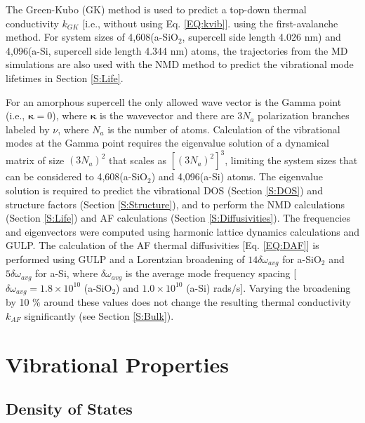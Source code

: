 \documentclass[aps,prb,onecolumn,preprint,superscriptaddress,footinbib,amsmath,amssymb,floatfix]{revtex4}
\begin{document}
The Green-Kubo (GK) method is used to predict a top-down thermal 
conductivity $k_{GK}$ [i.e., without using Eq. \eqref{EQ:kvib}].
\cite{mcquarrie_statistical_2000} using the 
first-avalanche method.\cite{chen_how_2010} 
For system sizes of 4,608(a-SiO$_2$, supercell side length 4.026 nm) 
and 4,096(a-Si, supercell side length 4.344 nm) atoms, 
the trajectories from 
the MD simulations are 
also used with the NMD method to predict 
the vibrational mode lifetimes in Section \ref{S:Life}. 

For an amorphous supercell 
the only allowed wave vector is the Gamma point 
(i.e., $\pmb{\kappa}=0$),  
where $\pmb{\kappa}$ is the wavevector and there are $3N_a$ 
polarization 
branches labeled by $\nu$, where $N_a$ is the number of atoms. 
Calculation of the vibrational modes at the Gamma point  
requires the eigenvalue solution of a dynamical matrix of size 
$(3N_a)^2$ that scales as $[(3N_a)^2]^3$, limiting the system 
sizes that can be considered to 4,608(a-SiO$_2$) and 4,096(a-Si) 
atoms. 
The eigenvalue solution is required to predict the vibrational 
DOS (Section \ref{S:DOS}) and structure factors 
(Section \ref{S:Structure}), and to perform the NMD calculations  
(Section \ref{S:Life})  
and AF calculations (Section \ref{S:Diffusivities}). 
The frequencies and eigenvectors were computed using harmonic
lattice dynamics calculations and GULP.\cite{gale_general_2003} 
The calculation of the AF thermal diffusivities 
[Eq. \eqref{EQ:DAF}] is performed using GULP and a Lorentzian 
broadening of $14\delta\omega_{avg}$ for a-SiO$_2$ and 
$5\delta\omega_{avg}$ for a-Si, 
where $\delta\omega_{avg}$ is the average mode 
frequency spacing 
[$\delta\omega_{avg} = 1.8 \times 10^{10}$ (a-SiO$_2$) 
and $1.0 \times 10^{10}$ (a-Si) rads$/$s].
\cite{feldman_thermal_1993,feldman_numerical_1999}  
Varying the broadening by 10 $\%$ around these values does not 
change the resulting thermal conductivity $k_{AF}$ significantly 
(see Section \ref{S:Bulk}).

\section{\label{S:Vibrational}Vibrational Properties}

\subsection{\label{S:DOS}Density of States}
\end{document}
